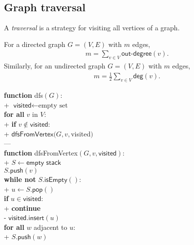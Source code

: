 \documentclass{article}
\begin{document}
\subsection{Graph traversal}

\begin{definition}
	A \emph{traversal} is a strategy for visiting all vertices of a graph.
\end{definition} 

\begin{lemma}
	For a directed graph $G=(V,E)$ with $m$ edges,
	\begin{align*}
		m=\sum_{v\in V} \textsf{out-degree}(v).
	\end{align*}
	Similarly, for an undirected graph $G=(V,E)$ with $m$ edges,
	\begin{align*}
		m=\frac{1}{2}\sum_{v\in V}\textsf{deg}(v).
	\end{align*}
\end{lemma}

\begin{pseudo}
\textbf{function} \textsf{dfs}$(G)$:											\\+
	$\textsf{visited}\leftarrow\text{empty set}$								\\
	\textbf{for all} $v$ in $V$:												\\+
		\textbf{if} $v\not\in\textsf{visited}$:									\\+
		$\textsf{dfsFromVertex}(G, v, $\textsf{visited}$)$						\\---
																				\\
\textbf{function} \textsf{dfsFromVertex}$(G,v,\textsf{visited})$: 				\\+
	$S\leftarrow \textsf{empty stack}$											\\
	$S.\textsf{push}(v)$														\\
	\textbf{while not} $S.\textsf{isEmpty}()$:									\\+
		$u\leftarrow S.\textsf{pop}()$											\\
		\textbf{if} $u\in \textsf{visited}$:									\\+
			\textbf{continue}													\\-
		$\textsf{visited}.\textsf{insert}(u)$									\\
		\textbf{for all} $w$ adjacent to $u$:									\\+
			$S.\textsf{push}(w)$
\end{pseudo}
\end{document}
